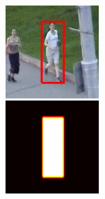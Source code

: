 \begin{figure}[t]
    \centering
    \begin{subfigure}[b]{0.13\textwidth}
        \centering
        \includegraphics[width=\textwidth]{figures/theoretical_foundations/fully_cnn_tracking_feature_maps_1.pdf}

\end{subfigure}
\end{figure}
